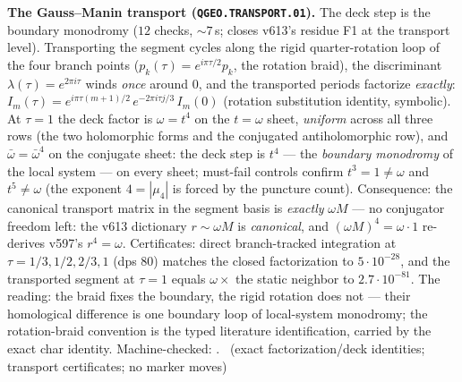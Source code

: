 \documentclass[11pt,a4paper]{article}
\theoremstyle{definition}
\begin{document}
\par\smallskip\noindent\textbf{The Gauss--Manin transport
(\texttt{QGEO.TRANSPORT.01}).}
The deck step is the boundary monodromy ($12$ checks, ${\sim}7$\,s;
closes v613's residue F1 at the transport level).  Transporting the
segment cycles along the rigid quarter-rotation loop of the four
branch points ($p_k(\tau)=e^{i\pi\tau/2}p_k$, the rotation braid),
the discriminant $\lambda(\tau)=e^{2\pi i\tau}$ winds \emph{once}
around $0$, and the transported periods factorize \emph{exactly}:
$I_m(\tau)=e^{i\pi\tau(m+1)/2}\,e^{-2\pi i\tau j/3}\,I_m(0)$
(rotation substitution identity, symbolic).  At $\tau=1$ the deck
factor is $\omega=t^4$ on the $t=\omega$ sheet, \emph{uniform}
across all three rows (the two holomorphic forms and the conjugated
antiholomorphic row), and $\bar\omega=\bar\omega^4$ on the conjugate
sheet: the deck step is $t^4$ --- the \emph{boundary monodromy} of
the local system --- on every sheet; must-fail controls confirm
$t^3=1\ne\omega$ and $t^5\ne\omega$ (the exponent $4=|\mu_4|$ is
forced by the puncture count).  Consequence: the canonical transport
matrix in the segment basis is \emph{exactly} $\omega M$ --- no
conjugator freedom left: the v613 dictionary $r\sim\omega M$ is
\emph{canonical}, and $(\omega M)^4=\omega\cdot 1$ re-derives
v597's $r^4=\omega$.  Certificates: direct branch-tracked
integration at $\tau=1/3,1/2,2/3,1$ (dps $80$) matches the closed
factorization to $5\cdot10^{-28}$, and the transported segment at
$\tau=1$ equals $\omega\times$ the static neighbor to
$2.7\cdot10^{-81}$.  The reading: the braid fixes the boundary, the
rigid rotation does not --- their homological difference is one
boundary loop of local-system monodromy; the rotation-braid
convention is the typed literature identification, carried by the
exact char identity.
Machine-checked: .
\mE\ (exact factorization/deck identities; transport certificates;
no marker moves)
\par\smallskip
\end{document}
